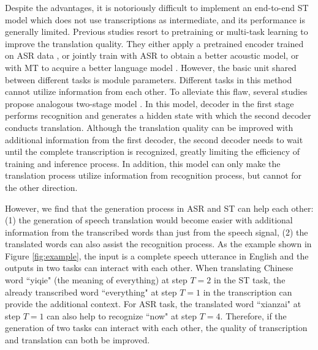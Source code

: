 \documentclass[letterpaper]{article} %
\begin{document}
Despite the advantages, it is notoriously difficult to implement an end-to-end ST model which does not use transcriptions as intermediate, and its performance is generally limited.
Previous studies resort to pretraining or multi-task learning to improve the translation quality. They either apply a pretrained encoder trained on ASR data \cite{bansal2018pre}, or jointly train with ASR to obtain a better acoustic model, or with MT to acquire a better language model \cite{weiss2017sequence,anastasopoulos2018leveraging,berard2018end}. However, the basic unit shared between different tasks is module parameters. Different tasks in this method cannot utilize information from each other. To alleviate this flaw, several studies propose analogous two-stage model  \cite{kano2017structured,anastasopoulos2018tied,sperber2019attention}.
In this model, decoder in the first stage performs recognition and generates a hidden state with which the second decoder conducts translation. Although the translation quality can be improved with additional information from the first decoder, the second decoder needs to wait until the complete transcription is recognized, greatly limiting the efficiency of training and inference process. In addition, this model can only make the translation process utilize information from recognition process, but cannot for the other direction.

However, we find that the generation process in ASR and ST can help each other: (1) the generation of speech translation would become easier with additional information from the transcribed words than just from the speech signal, (2) the translated words can also assist the recognition process. As the example shown in Figure \ref{fig:example}, the input is a complete speech utterance in English and the outputs in two tasks can interact with each other. When translating Chinese word ``yiqie" (the meaning of everything) at step $T=2$ in the ST task, the already transcribed word ``everything" at step $T=1$ in the transcription can provide the additional context. For ASR task, the translated word ``xianzai" at step $T=1$ can also help to recognize ``now" at step $T=4$. Therefore, if the generation of two tasks can interact with each other, the quality of transcription and translation can both be improved.
\end{document}
